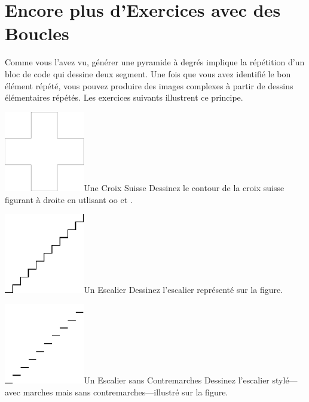 \documentclass[a4paper,10pt,twoside]{book}
\begin{document}
\section{Encore plus d’Exercices avec des Boucles } 

Comme vous l'avez vu, générer une pyramide à degrés implique la répétition d'un bloc de 
code qui dessine deux segment. Une fois que vous avez identifié le bon élément répété, 
vous pouvez produire des images complexes à partir de dessins élémentaires répétés. Les 
exercices suivants illustrent ce principe. 

\begin{exofigwithsizeandtitle}[0.65]{\includegraphics[width=3.5cm]{loopCross}}{Une Croix Suisse}
Dessinez le contour de la croix suisse figurant à droite en utlisant  oo  et .
\end{exofigwithsizeandtitle}

\begin{exofigwithsizeandtitle}[0.65]{\includegraphics[width=3.5cm]{loopStair}}{Un Escalier}
Dessinez l’escalier représenté sur la figure. 
\end{exofigwithsizeandtitle}

\begin{exofigwithsizeandtitle}[0.65]{\includegraphics[width=3.5cm]{loopStylisedStair}}{Un Escalier sans Contremarches} 
Dessinez  l’escalier stylé—avec marches mais sans contremarches—illustré sur  la figure.
\end{exofigwithsizeandtitle}
\end{document}
